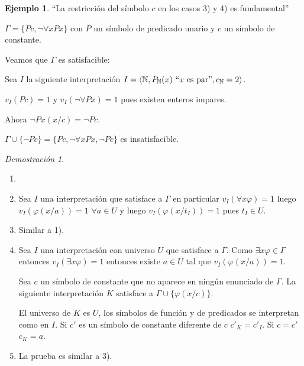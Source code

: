 \documentclass[a4paper,11pt]{article}
\theoremstyle{definition}
\newtheorem{exap}{Ejemplo}[section]
\theoremstyle{remark}
\newtheorem*{demo}{Demostración}
\def\NN{\mathbb{N}}
\begin{document}
\begin{exap}
    ``La restricción del símbolo $c$ en los casos 3) y 4) es
    fundamental''
    
    $\Gamma = \{ P c, \lnot \forall x Px \}$ con $P$ un símbolo de
    predicado unario y $c$ un símbolo de constante.
    
    Veamos que $\Gamma$ es satisfacible:
    
    Sea $I$  la siguiente interpretación $I = \langle \NN, 
    P_{\NN}(x)\ ``x\text{ es par''}, c_{\NN} = 2 \rangle$.
    
    $v_I(P c) = 1$ y $v_I(\lnot \forall P x) = 1$ pues existen 
    enteros impares.
    
    Ahora $\lnot P x (x/c) = \lnot P c$.
    
    $\Gamma \cup \{ \lnot P c\} = \{ P c, \lnot \forall x P x, \lnot P c\}$
    es insatisfacible.
\end{exap}

\begin{demo}
    \begin{enumerate}
        \item []
        
        \item Sea $I$ una interpretación que satisface a $\Gamma$
        en particular $v_I(\forall x \varphi) = 1$ luego
        $v_I(\varphi(x/a)) = 1$ $\forall a \in U$ y 
        luego $v_I(\varphi(x/t_I)) = 1$ pues $t_I \in U$.
        
        \item Similar a 1).
        
        \item Sea $I$ una interpretación con universo $U$
        que satisface a $\Gamma$. Como $\exists x \varphi \in \Gamma$
        entonces $v_I(\exists x \varphi) = 1$ entonces 
        existe $a \in U$ tal que $v_I(\varphi(x/a)) = 1$.
        
        Sea $c$ un símbolo de constante que no aparece en
        ningún enunciado de $\Gamma$. La siguiente interpretación
        $K$ satisface a $\Gamma \cup \{ \varphi(x/c) \}$.
        
        El universo de $K$ es $U$, los símbolos de función y
        de predicados se interpretan como en $I$. Si $c'$ es
        un símbolo de constante diferente de $c$ $c'_K = c'_I$.
        Si $c = c'$ $c_K = a$.
        
        \item La prueba es similar a 3).
    \end{enumerate}
\end{demo}
\end{document}
